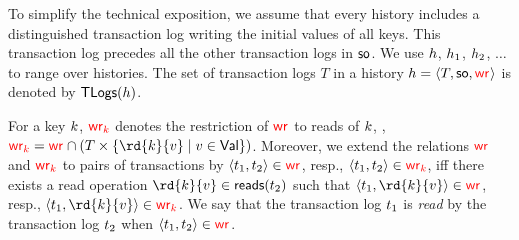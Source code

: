 

To simplify the technical exposition, we assume that every history includes a distinguished transaction log writing the initial values of all keys. This transaction log precedes all the other transaction logs in $\so$. We use $\hist$, $\hist_1$, $\hist_2$, $\ldots$ to range over histories. The set of transaction logs $T$ in a history $\hist=\tup{T, \so, \wro}$ is denoted by $\tlogs{\hist}$.

For a key $\key$, $\wro[\key]$ denotes the restriction of $\wro$ to reads of $\key$, \ie, $\wro[\key]=\wro\cap (T\times \{\rd{\key}{\val}\mid \val\in \Val\})$. Moreover, we extend the relations $\wro$ and $\wro[\key]$ to pairs of transactions by $\tup{\tr_1,\tr_2}\in \wro$, resp., $\tup{\tr_1,\tr_2}\in \wro[\key]$, iff there exists a read operation $\rd{\key}{\val}\in \readOp{\tr_2}$ such that $\tup{\tr_1,\rd{\key}{\val}}\in \wro$, resp., $\tup{\tr_1,\rd{\key}{\val}}\in \wro[\key]$. 
We say that the transaction log $\tr_1$ is \emph{read} by the transaction log $\tr_2$ when $\tup{\tr_1,\tr_2}\in \wro$. %
%


